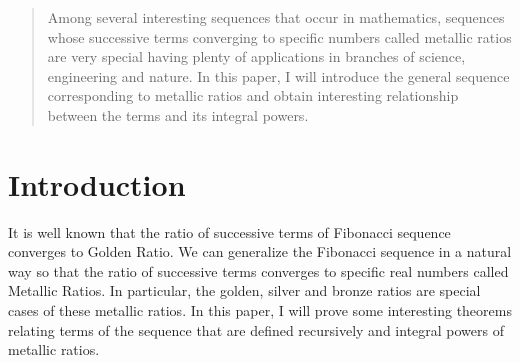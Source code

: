 \documentclass{rmutt-seminar}
\author{%
Dr. R. SIVARAMAN
}
\begin{document}
\makeseminartitle

\begin{abstract}
	Among several interesting sequences that occur in mathematics, sequences whose successive terms converging to specific 
	numbers called metallic ratios are very special having plenty of applications in branches of science, engineering and 
	nature. In this paper, I will introduce the general sequence corresponding to metallic ratios and obtain interesting 
	relationship between the terms and its integral powers. 
\end{abstract}



\section{Introduction}
It is well known that the ratio of successive terms of Fibonacci sequence converges to Golden Ratio. We can
generalize the Fibonacci sequence in a natural way so that the ratio of successive terms converges to specific real 
numbers called Metallic Ratios. In particular, the golden, silver and bronze ratios are special cases of these
metallic ratios. In this paper, I will prove some interesting theorems relating terms of the sequence that are 
defined recursively and integral powers of metallic ratios.
\end{document}
